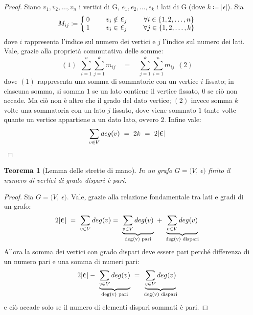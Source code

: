 \documentclass[12pt,twoscolu]{article}
\newcommand{\Eps}{${\Large$\epsilon$}$}
\newcommand{\grafo}{(V, \: \Eps)}
\newtheorem{theorem}{Teorema}
\begin{document}
\begin{proof}
Siano $v_1, v_2,\ldots ,v_n$ i vertici di G, $e_1, e_2,\ldots, e_k$ i lati di G (dove $k \coloneqq | \Eps |$). Sia
\[
M_{ij} \coloneqq \left\{
\setlength\arraycolsep{2pt}
\begin{array}{ccc} 0 &\qquad v_i \notin \ \Eps_j &\qquad \forall i \in \{1, 2, \ldots , n\} \\ \relax
1 &\qquad v_i \in \ \Eps_j &\qquad \forall j \in \{1, 2, \ldots ,k \} 
\end{array}\right
.
\]
dove $i$ rappresenta l'indice sul numero dei vertici e $j$ l'indice sul numero dei lati. Vale, grazie alla proprietà commutativa delle somme:
$$ (1)\ \ \sum_{i=1}^n \sum_{j=1}^k m_{ij} \quad = \quad \sum_{j=1}^k\sum_{i=1}^n m_{ij}\ \ (2)$$
dove $(1)$ rappresenta una somma di sommatorie con un vertice $i$ fissato; in ciascuna somma, si somma $1$ se un lato contiene il vertice fissato, $0$ se ciò non accade. Ma ciò non è altro che il grado del dato vertice; $(2)$ invece somma $k$ volte una sommatoria con un lato $j$ fissato, dove viene sommato $1$ tante volte quante un vertice appartiene a un dato lato, ovvero 2. Infine vale:
\begin{align*}
 \sum_{v\in V} deg(v) \ = \ 2k \ =\ 2 | \mathlarger{\mathlarger{\epsilon}} |
 \end{align*}
\end{proof}

\begin{theorem}[Lemma delle strette di mano]
In un grafo $G = \grafo$ finito il numero di vertici di grado dispari è pari.
\end{theorem}

\begin{proof}
Sia $G = \grafo$. Vale, grazie alla relazione fondamentale tra lati e gradi di un grafo:
\[
2 | \mathlarger{\mathlarger{\epsilon}} | \ =\ \sum_{v\in V} deg (v) 
= \ \underbrace{\sum_{v\in V} deg (v)}_{\text{deg(v) pari}} \ + \ \underbrace{\sum_{v\in V} deg (v)}_{\text{deg(v) dispari}}
\]
Allora la somma dei vertici con grado dispari deve essere pari perché differenza di un numero pari e una somma di numeri pari:
\[
2 | \mathlarger{\mathlarger{\epsilon}}| - \ \underbrace{\sum_{v\in V} deg (v)}_{\text{deg(v) pari}} \ = \ \underbrace{\sum_{v\in V} deg (v)}_{\text{deg(v) dispari}} 
\]
e ciò accade solo se il numero di elementi dispari sommati è pari.
\end{proof}
\end{document}
